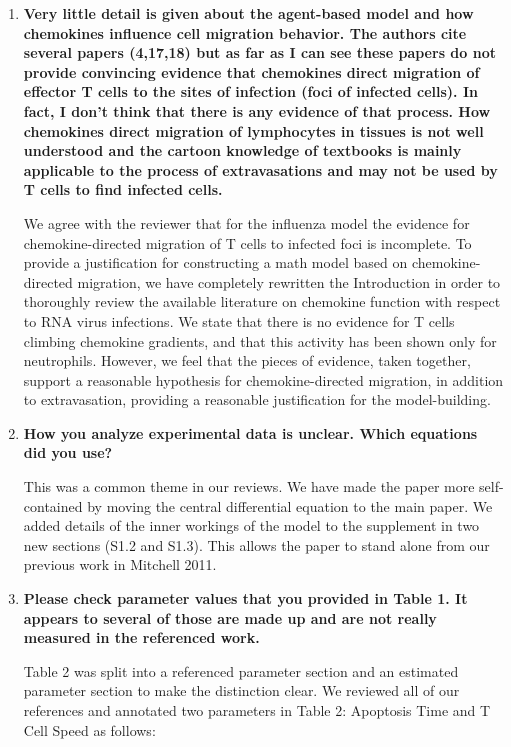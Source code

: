 \documentclass[10pt]{article}
\begin{document}
\begin{enumerate}

\item \textbf{Very little detail is given about the agent-based model and how chemokines influence cell migration behavior. The authors cite several papers (4,17,18) but as far as I can see these papers do not provide convincing evidence that chemokines direct migration of effector T cells to the sites of infection (foci of infected cells). In fact, I don't think that there is any evidence of that process. How chemokines direct migration of lymphocytes in tissues is not well understood and the cartoon knowledge of textbooks is mainly applicable to the process of extravasations and may not be used by T cells to find infected cells.}

We agree with the reviewer that for the influenza model the evidence for chemokine-directed migration of T cells to infected foci is incomplete.  To provide a justification for constructing a math model based on chemokine-directed migration, we have completely rewritten the Introduction in order to thoroughly review the available literature on chemokine function with respect to RNA virus infections.  We state that there is no evidence for T cells climbing chemokine gradients, and that this activity has been shown only for neutrophils.  However, we feel that the pieces of evidence, taken together, support a reasonable hypothesis for chemokine-directed migration, in addition to extravasation, providing a reasonable justification for the model-building. \\


\item \textbf{How you analyze experimental data is unclear. Which equations did you use?}

This was a common theme in our reviews.  We have made the paper more self-contained by moving the central differential equation to the main paper.  We added details of the inner workings of the model to the supplement in two new sections (S1.2 and S1.3).  This allows the paper to stand alone from our previous work in Mitchell 2011.  \\

\pagebreak

\item \textbf{Please check parameter values that you provided in Table 1. It appears to several of those are made up and are not really measured in the referenced work.}

Table 2 was split into a referenced parameter section and an estimated parameter section to make the distinction clear.  We reviewed all of our references and annotated two parameters in Table 2: Apoptosis Time and T Cell Speed as follows: 


\end{enumerate}
\end{document}
